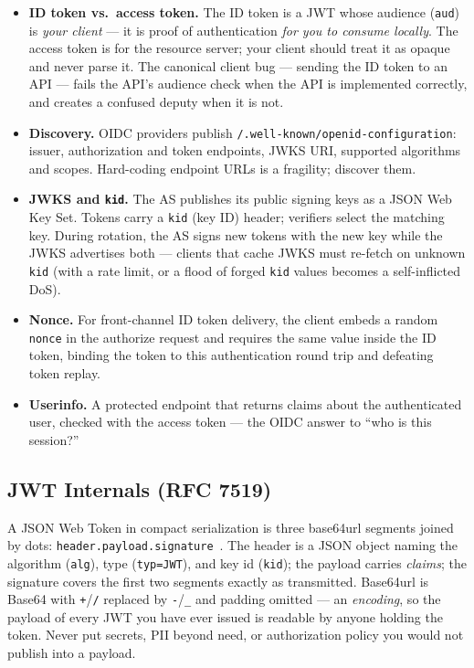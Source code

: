 \begin{itemize}
  \item \textbf{ID token vs.\ access token.} The ID token is a JWT whose
        audience (\texttt{aud}) is \emph{your client} --- it is proof of
        authentication \emph{for you to consume locally}. The access token
        is for the resource server; your client should treat it as opaque
        and never parse it. The canonical client bug --- sending the ID
        token to an API --- fails the API's audience check when the API is
        implemented correctly, and creates a confused deputy when it is not.
  \item \textbf{Discovery.} OIDC providers publish
        \texttt{/.well-known/openid-configuration}: issuer, authorization
        and token endpoints, JWKS URI, supported algorithms and scopes.
        Hard-coding endpoint URLs is a fragility; discover them.
  \item \textbf{JWKS and \texttt{kid}.} The AS publishes its public signing
        keys as a JSON Web Key Set. Tokens carry a \texttt{kid} (key ID)
        header; verifiers select the matching key. During rotation, the AS
        signs new tokens with the new key while the JWKS advertises both ---
        clients that cache JWKS must re-fetch on unknown \texttt{kid}
        (with a rate limit, or a flood of forged \texttt{kid} values becomes
        a self-inflicted DoS).
  \item \textbf{Nonce.} For front-channel ID token delivery, the client
        embeds a random \texttt{nonce} in the authorize request and requires
        the same value inside the ID token, binding the token to this
        authentication round trip and defeating token replay.
  \item \textbf{Userinfo.} A protected endpoint that returns claims about
        the authenticated user, checked with the access token --- the OIDC
        answer to ``who is this session?''
\end{itemize}

\subsection{JWT Internals (RFC 7519)}
\label{sec:ch5-jwt}

A JSON Web Token in compact serialization is three base64url segments joined
by dots: \texttt{header.payload.signature}~\cite{rfc7519}. The header is a
JSON object naming the algorithm (\texttt{alg}), type (\texttt{typ=JWT}),
and key id (\texttt{kid}); the payload carries \emph{claims}; the signature
covers the first two segments exactly as transmitted. Base64url is Base64
with \texttt{+}/\texttt{/} replaced by \texttt{-}/\texttt{\_} and padding
omitted --- an \emph{encoding}, so the payload of every JWT you have ever
issued is readable by anyone holding the token. Never put secrets, PII
beyond need, or authorization policy you would not publish into a payload.

